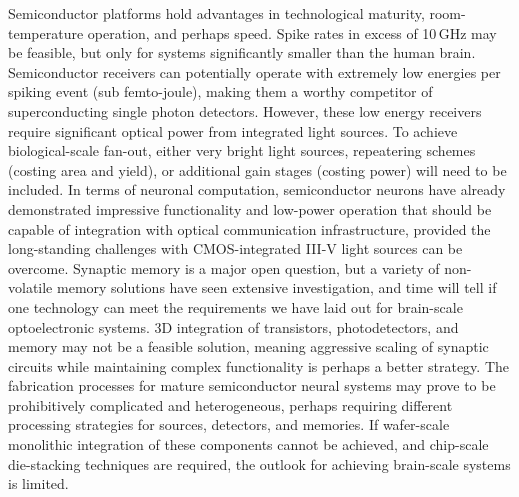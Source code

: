 \documentclass[twocolumn]{article}
\begin{document}
Semiconductor platforms hold advantages in technological maturity, room-temperature operation, and perhaps speed. Spike rates in excess of 10\,GHz may be feasible, but only for systems significantly smaller than the human brain. Semiconductor receivers can potentially operate with extremely low energies per spiking event (sub femto-joule), making them a worthy competitor of superconducting single photon detectors. However, these low energy receivers require significant optical power from integrated light sources. To achieve biological-scale fan-out, either very bright light sources, repeatering schemes (costing area and yield), or additional gain stages (costing power) will need to be included. In terms of neuronal computation, semiconductor neurons have already demonstrated impressive functionality and low-power operation that should be capable of integration with optical communication infrastructure, provided the long-standing challenges with CMOS-integrated III-V light sources can be overcome. Synaptic memory is a major open question, but a variety of non-volatile memory solutions have seen extensive investigation, and time will tell if one technology can meet the requirements we have laid out for brain-scale optoelectronic systems. 3D integration of transistors, photodetectors, and memory may not be a feasible solution, meaning aggressive scaling of synaptic circuits while maintaining complex functionality is perhaps a better strategy. The fabrication processes for mature semiconductor neural systems may prove to be prohibitively complicated and heterogeneous, perhaps requiring different processing strategies for sources, detectors, and memories. If wafer-scale monolithic integration of these components cannot be achieved, and chip-scale die-stacking techniques are required, the outlook for achieving brain-scale systems is limited.
\end{document}
